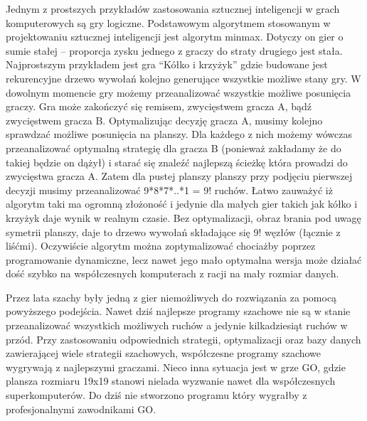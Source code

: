 \begin{par}
Jednym z prostszych przykładów zastosowania sztucznej inteligencji w grach komputerowych są gry logiczne. 
Podstawowym algorytmem stosowanym w projektowaniu sztucznej inteligencji jest algorytm minmax. Dotyczy on gier o sumie stałej -- proporcja zysku jednego z graczy do straty drugiego jest stała. 
Najprostszym przykładem jest gra ``Kółko i krzyżyk'' gdzie budowane jest rekurencyjne drzewo wywołań kolejno generujące wszystkie możliwe stany gry. 
W dowolnym momencie gry możemy przeanalizować wszystkie możliwe posunięcia graczy. Gra może zakończyć się remisem, zwycięstwem gracza A, bądź zwycięstwem gracza B.
Optymalizując decyzję gracza A, musimy kolejno sprawdzać możliwe posunięcia na planszy. Dla każdego z nich możemy wówczas przeanalizować optymalną strategię dla gracza B (ponieważ zakładamy że do takiej będzie on dążył) i starać się znaleźć najlepszą ścieżkę która prowadzi do zwycięstwa gracza A.
Zatem dla pustej planszy planszy przy podjęciu pierwszej decyzji musimy przeanalizować 9*8*7*..*1 = 9! ruchów.
Łatwo zauważyć iż algorytm taki ma ogromną złożoność i jedynie dla małych gier takich jak kółko i krzyżyk daje wynik w realnym czasie.
Bez optymalizacji, obraz brania pod uwagę symetrii planszy, daje to drzewo wywołań składające się 9! węzłów (łącznie z liśćmi). 
Oczywiście algorytm można zoptymalizować chociażby poprzez programowanie dynamiczne, lecz nawet jego mało optymalna wersja może działać dość szybko na współczesnych komputerach z racji na mały rozmiar danych.
\end{par}
\begin{par}
Przez lata szachy były jedną z gier niemożliwych do rozwiązania za pomocą powyższego podejścia.
Nawet dziś najlepsze programy szachowe nie są w stanie przeanalizować wszystkich możliwych ruchów a jedynie kilkadziesiąt ruchów w przód.
Przy zastosowaniu odpowiednich strategii, optymalizacji oraz bazy danych zawierającej wiele strategii szachowych, współczesne programy szachowe wygrywają z najlepszymi graczami.
Nieco inna sytuacja jest w grze GO, gdzie plansza rozmiaru 19x19 stanowi nielada wyzwanie nawet dla współczesnych superkomputerów. 
Do dziś nie stworzono programu który wygrałby z profesjonalnymi zawodnikami GO.
\end{par}
